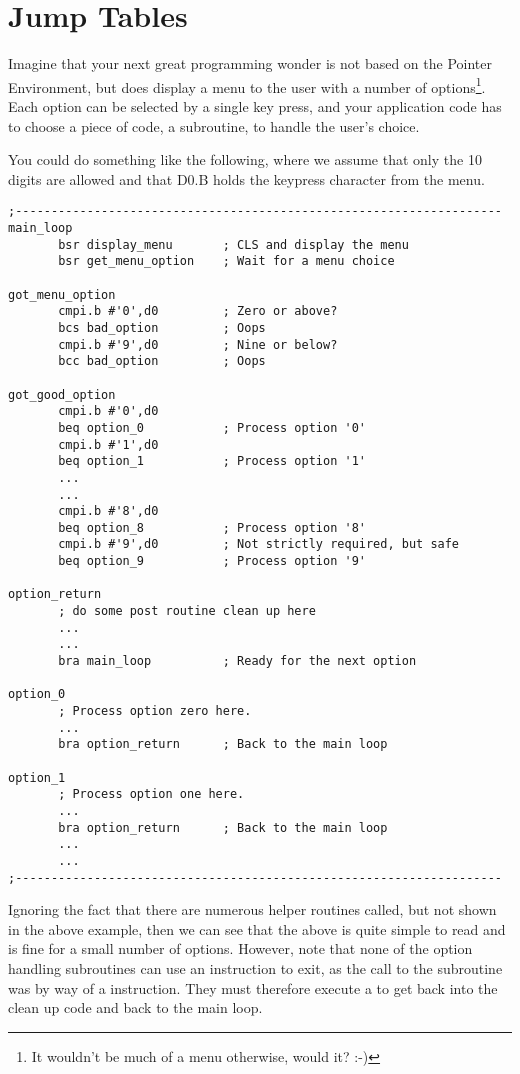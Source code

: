 \chapter{Jump Tables}

Imagine that your next great programming wonder is not based on the Pointer Environment, but does display a menu to the user with a number of options\footnote{It wouldn't be much of a menu otherwise, would it? :-)}. Each option can be selected by a single key press, and your application code has to choose a piece of code, a subroutine, to handle the user's choice.

You could do something like the following, where we assume that only the 10 digits are allowed and that D0.B holds the keypress character from the menu.

\begin{lstlisting}[firstnumber=1,caption={Processing User Options - First Attempt}]
;--------------------------------------------------------------------
main_loop
       bsr display_menu       ; CLS and display the menu
       bsr get_menu_option    ; Wait for a menu choice
       
got_menu_option
       cmpi.b #'0',d0         ; Zero or above?
       bcs bad_option         ; Oops
       cmpi.b #'9',d0         ; Nine or below?
       bcc bad_option         ; Oops
       
got_good_option
       cmpi.b #'0',d0
       beq option_0           ; Process option '0'
       cmpi.b #'1',d0
       beq option_1           ; Process option '1'
       ...
       ...
       cmpi.b #'8',d0
       beq option_8           ; Process option '8'
       cmpi.b #'9',d0         ; Not strictly required, but safe
       beq option_9           ; Process option '9'

option_return     
       ; do some post routine clean up here      
       ...
       ...
       bra main_loop          ; Ready for the next option

option_0
       ; Process option zero here.
       ...
       bra option_return      ; Back to the main loop
       
option_1
       ; Process option one here.
       ...
       bra option_return      ; Back to the main loop
       ...
       ...
;--------------------------------------------------------------------
\end{lstlisting}

Ignoring the fact that there are numerous helper routines called, but not shown in the above example, then we can see that the above is quite simple to read and is fine for a small number of options. However, note that none of the option handling subroutines can use an  instruction to exit, as the call to the subroutine was by way of a  instruction. They must therefore execute a  to get back into the clean up code and back to the main loop.

